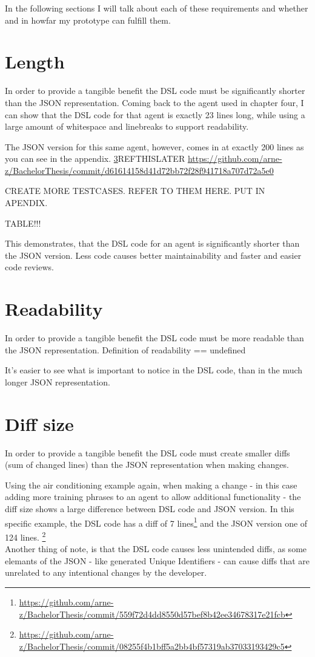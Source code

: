 In the following sections I will talk about each of these requirements and whether and in howfar my prototype can fulfill them.

\section{Length}

In order to provide a tangible benefit the DSL code must be significantly shorter than the JSON representation. Coming back to the agent used in chapter four, I can show that the DSL code for that agent is exactly 23 lines long, while using a large amount of whitespace and linebreaks to support readability.

The JSON version for this same agent, however, comes in at exactly 200 lines as you can see in the appendix. \ref{}REFTHISLATER \url{https://github.com/arne-z/BachelorThesis/commit/d61614158d41d72bb72f28f941718a707d72a5e0}

CREATE MORE TESTCASES. REFER TO THEM HERE. PUT IN APENDIX.

TABLE!!!


This demonstrates, that the DSL code for an agent is significantly shorter than the JSON version. Less code causes better maintainability and faster and easier code reviews. 

\section{Readability}
In order to provide a tangible benefit the DSL code must be more readable than the JSON representation.
\citeNeeded Definition of readability == undefined

It's easier to see what is important to notice in the DSL code, than in the much longer JSON representation.



\section{Diff size}
In order to provide a tangible benefit the DSL code must create smaller diffs (sum of changed lines) than the JSON representation when making changes.

Using the air conditioning example again, when making a change - in this case adding more training phrases to an agent to allow additional functionality - the diff size shows a large difference between DSL code and JSON version. In this specific example, the DSL code has a diff of 7 lines\footnote{\url{https://github.com/arne-z/BachelorThesis/commit/559f72d4dd8550d57bef8b42ee34678317e21fcb}} and the JSON version one of 124 lines.
\footnote{\url{https://github.com/arne-z/BachelorThesis/commit/08255f4b1bff5a2bb4bf57319ab37033193429c5}}\\
Another thing of note, is that the DSL code causes less unintended diffs, as some elemants of the JSON - like generated Unique Identifiers - can cause diffs that are unrelated to any intentional changes by the developer.




